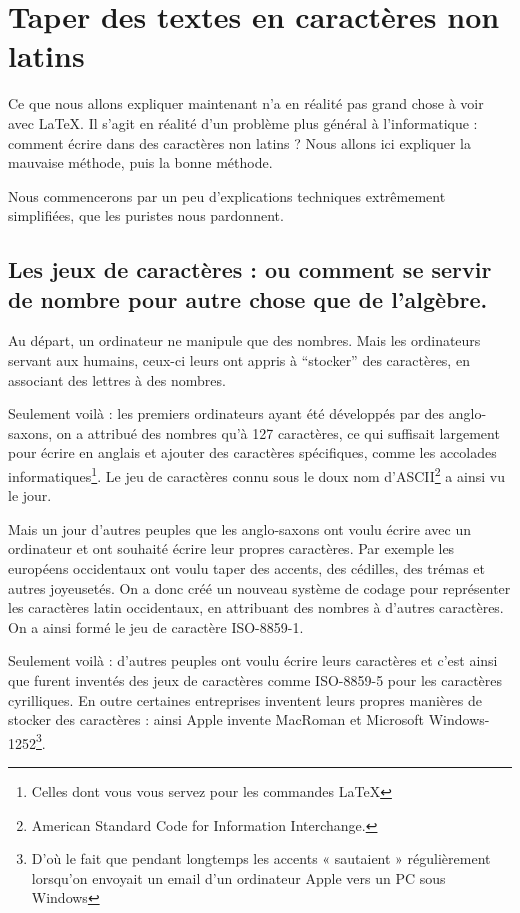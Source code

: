 \section{Taper des textes en caractères non latins}\label{utf8}

Ce que nous allons expliquer maintenant n'a en réalité pas grand chose à voir avec \LaTeX. Il s'agit en réalité d'un problème plus général à l'informatique : comment écrire dans des caractères non latins ? Nous allons ici expliquer la mauvaise méthode, puis la bonne méthode.

Nous commencerons par un peu d'explications techniques extrêmement simplifiées, que les puristes nous pardonnent.

\subsection{Les jeux de caractères : ou comment se servir de nombre pour autre chose que de l'algèbre.}

Au départ, un ordinateur ne manipule que des nombres. Mais les ordinateurs servant aux humains, ceux-ci leurs ont appris à \enquote{stocker} des caractères, en associant des lettres à des nombres.

Seulement voilà : les premiers ordinateurs ayant été développés par des anglo-saxons, on a  attribué des nombres qu'à  127 caractères, ce qui suffisait largement pour écrire en anglais et ajouter des caractères spécifiques, comme les accolades informatiques\footnote{Celles dont vous vous servez pour les commandes \LaTeX}.  Le jeu de caractères connu sous le doux nom d'ASCII\footnote{\textenglish{American Standard Code for Information Interchange.}} a ainsi vu le jour.

Mais un jour d'autres peuples que les anglo-saxons ont voulu écrire avec un ordinateur et ont souhaité écrire leur propres caractères. Par exemple les européens occidentaux ont voulu taper des accents, des cédilles, des trémas et autres joyeusetés. On a donc créé un nouveau système de codage pour représenter les caractères latin occidentaux, en attribuant des nombres à d'autres caractères. On a ainsi formé le jeu de caractère  ISO-8859-1. 

Seulement voilà : d'autres peuples ont voulu écrire leurs caractères et c'est ainsi que furent inventés des jeux de caractères comme ISO-8859-5 pour les caractères cyrilliques. En outre certaines entreprises inventent leurs propres manières de stocker des caractères :  ainsi Apple invente MacRoman et Microsoft Windows-1252\footnote{D'où le fait que pendant longtemps les accents « sautaient » régulièrement lorsqu'on envoyait un email d'un ordinateur Apple vers un PC sous Windows}. 

